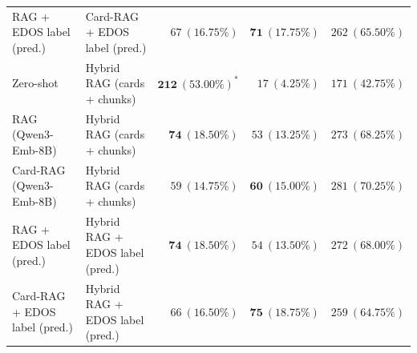 \begin{table}[t]
{\begin{tabular}{llrrr}
RAG + EDOS label (pred.) & Card-RAG + EDOS label (pred.) & $67\ (16.75\%)$ & $\mathbf{71\ (17.75\%)}$ & $262\ (65.50\%)$ \\
Zero-shot & Hybrid RAG (cards + chunks) & $\mathbf{212\ (53.00\%)}^*$ & $17\ (4.25\%)$ & $171\ (42.75\%)$ \\
RAG (Qwen3-Emb-8B) & Hybrid RAG (cards + chunks) & $\mathbf{74\ (18.50\%)}$ & $53\ (13.25\%)$ & $273\ (68.25\%)$ \\
Card-RAG (Qwen3-Emb-8B) & Hybrid RAG (cards + chunks) & $59\ (14.75\%)$ & $\mathbf{60\ (15.00\%)}$ & $281\ (70.25\%)$ \\
RAG + EDOS label (pred.) & Hybrid RAG + EDOS label (pred.) & $\mathbf{74\ (18.50\%)}$ & $54\ (13.50\%)$ & $272\ (68.00\%)$ \\
Card-RAG + EDOS label (pred.) & Hybrid RAG + EDOS label (pred.) & $66\ (16.50\%)$ & $\mathbf{75\ (18.75\%)}$ & $259\ (64.75\%)$ \\
\bottomrule
\end{tabular}%
}
\end{table}
